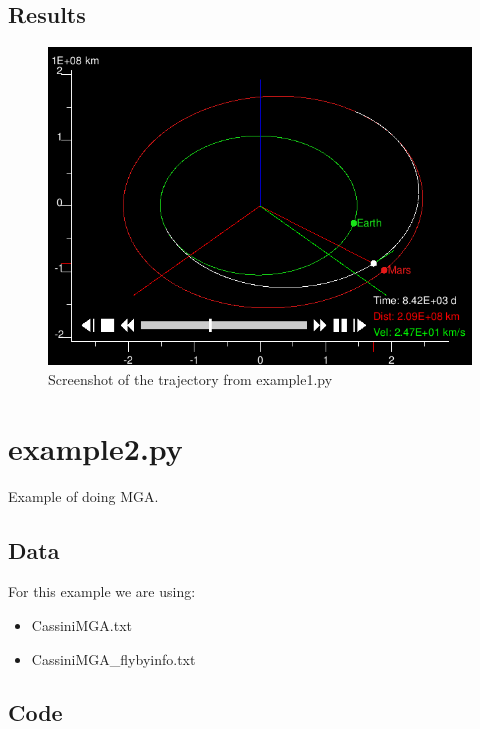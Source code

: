 \documentclass[a4paper,11pt]{article}
\begin{document}
\subsection{Results}
\begin{figure}[H]
\centering
\includegraphics[width=1\textwidth]{img/example1}
\caption{Screenshot of the trajectory from example1.py}
\label{img:example1}
\end{figure}


\newpage
\section{example2.py}\label{app:example2}
Example of doing \gls{MGA}.
\subsection{Data}
For this example we are using:

\begin{itemize}
\item CassiniMGA.txt
\item CassiniMGA\_flybyinfo.txt
\end{itemize}
\subsection{Code}

\end{document}
